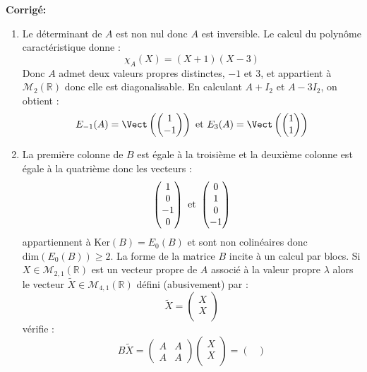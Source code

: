 \documentclass[a4paper,twoside,french,10pt]{VcCours}
\newcommand{\corr}{\textbf{Corrigé:}}
\begin{document}
\corr \begin{enumerate}
\item Le déterminant de $A$ est non nul donc $A$ est inversible. Le calcul du polynôme caractéristique donne :
$$ \chi_A(X) = (X+1)(X-3)$$
Donc $A$ admet deux valeurs propres distinctes, $-1$ et $3$, et appartient à $\mathcal{M}_2(\mathbb{R})$ donc elle est diagonalisable. En calculant $A+I_2$ et $A-3I_2$, on obtient :
$$ E_{-1}(A) = \Vect \left( \begin{pmatrix}
1 \\
-1 \\
\end{pmatrix}\right) \hbox{ et } E_{3}(A) = \Vect \left( \begin{pmatrix}
1 \\
1 \\
\end{pmatrix}\right)$$
\item La première colonne de $B$ est égale à la troisième et la deuxième colonne est égale à la quatrième donc les vecteurs :
$$ \begin{pmatrix}
1 \\
0 \\
-1 \\
0
\end{pmatrix} \hbox{ et } \begin{pmatrix}
0 \\
1 \\
0 \\
-1
\end{pmatrix}$$
appartiennent à $\textrm{Ker}(B)= E_0(B)$ et sont non colinéaires donc $\textrm{dim}(E_0(B)) \geq 2$. La forme de la matrice $B$ incite à un calcul par blocs. Si $X \in \mathcal{M}_{2,1}(\mathbb{R})$ est un vecteur propre de $A$ associé à la valeur propre $\lambda$ alors le vecteur $\tilde{X} \in \mathcal{M}_{4,1}(\mathbb{R})$ défini (abusivement) par :
$$ \tilde{X} = \begin{pmatrix}
X \\
X \\
\end{pmatrix}$$
vérifie :
$$ B \tilde{X} = \begin{pmatrix}
A & A \\
A & A 
\end{pmatrix} \begin{pmatrix}
X \\
X \\
\end{pmatrix} = \begin{pmatrix}

\end{pmatrix}$$
\end{enumerate}
\end{document}
